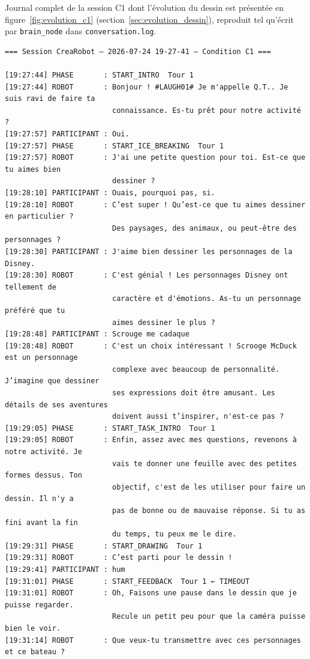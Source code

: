 \documentclass[11pt]{article}
\begin{document}
Journal complet de la session C1 dont l'évolution du dessin est présentée en figure~\ref{fig:evolution_c1} (section~\ref{sec:evolution_dessin}), reproduit tel qu'écrit par \texttt{brain\_node} dans \texttt{conversation.log}.

{\small
\begin{verbatim}
=== Session CreaRobot — 2026-07-24 19-27-41 — Condition C1 ===

[19:27:44] PHASE       : START_INTRO  Tour 1
[19:27:44] ROBOT       : Bonjour ! #LAUGH01# Je m'appelle Q.T.. Je suis ravi de faire ta
                         connaissance. Es-tu prêt pour notre activité ?
[19:27:57] PARTICIPANT : Oui.
[19:27:57] PHASE       : START_ICE_BREAKING  Tour 1
[19:27:57] ROBOT       : J'ai une petite question pour toi. Est-ce que tu aimes bien
                         dessiner ?
[19:28:10] PARTICIPANT : Ouais, pourquoi pas, si.
[19:28:10] ROBOT       : C’est super ! Qu’est-ce que tu aimes dessiner en particulier ?
                         Des paysages, des animaux, ou peut-être des personnages ?
[19:28:30] PARTICIPANT : J'aime bien dessiner les personnages de la Disney.
[19:28:30] ROBOT       : C'est génial ! Les personnages Disney ont tellement de
                         caractère et d'émotions. As-tu un personnage préféré que tu
                         aimes dessiner le plus ?
[19:28:48] PARTICIPANT : Scrouge me cadaque
[19:28:48] ROBOT       : C'est un choix intéressant ! Scrooge McDuck est un personnage
                         complexe avec beaucoup de personnalité. J’imagine que dessiner
                         ses expressions doit être amusant. Les détails de ses aventures
                         doivent aussi t’inspirer, n'est-ce pas ?
[19:29:05] PHASE       : START_TASK_INTRO  Tour 1
[19:29:05] ROBOT       : Enfin, assez avec mes questions, revenons à notre activité. Je
                         vais te donner une feuille avec des petites formes dessus. Ton
                         objectif, c'est de les utiliser pour faire un dessin. Il n'y a
                         pas de bonne ou de mauvaise réponse. Si tu as fini avant la fin
                         du temps, tu peux me le dire.
[19:29:31] PHASE       : START_DRAWING  Tour 1
[19:29:31] ROBOT       : C’est parti pour le dessin !
[19:29:41] PARTICIPANT : hum
[19:31:01] PHASE       : START_FEEDBACK  Tour 1 ← TIMEOUT
[19:31:01] ROBOT       : Oh, Faisons une pause dans le dessin que je puisse regarder.
                         Recule un petit peu pour que la caméra puisse bien le voir.
[19:31:14] ROBOT       : Que veux-tu transmettre avec ces personnages et ce bateau ?

\end{verbatim}}
\end{document}
